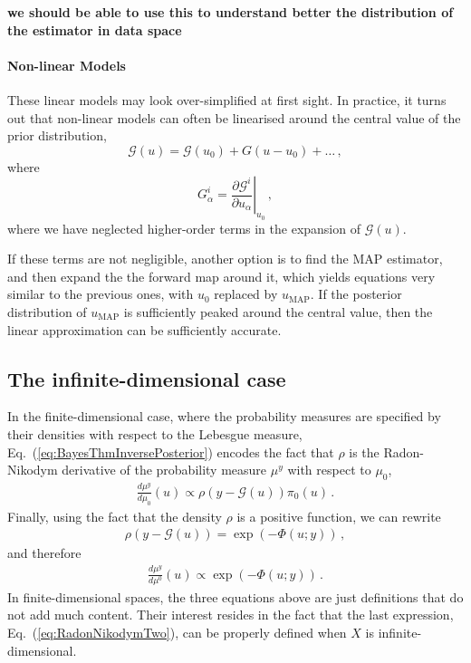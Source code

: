 {\bf we should be able to use this to understand better the distribution of the estimator in data space} 

\paragraph{Non-linear Models}

These linear models may look over-simplified at first sight. In practice, it
turns out that non-linear models can often be linearised around the central
value of the prior distribution, 
\begin{equation}
  \label{eq:LinU0}
  \mathcal{G}(u) = \mathcal{G}(u_0) + G \left(u - u_0\right) + \ldots\, ,
\end{equation}
where 
\begin{equation}
  \label{eq:FirstDerU0}
  G^i_\alpha = \left. \frac{\partial \mathcal{G}^i}{\partial u_\alpha} \right|_{u_0}\, ,
\end{equation}
where we have neglected higher-order terms in the expansion of $\mathcal{G}(u)$.

If these terms are not negligible, another option is to find the MAP estimator,
and then expand the the forward map around it, which yields equations very
similar to the previous ones, with $u_0$ replaced by $u_\mathrm{MAP}$. If the
posterior distribution of $u_\mathrm{MAP}$ is sufficiently peaked around the
central value, then the linear approximation can be sufficiently accurate. 


\subsection{The infinite-dimensional case}
\label{sec:infin-dimens-case}

In the finite-dimensional case, where the probability measures are
specified by their densities with respect to the Lebesgue measure,
Eq.~(\ref{eq:BayesThmInversePosterior}) encodes the fact that $\rho$
is the Radon-Nikodym derivative of the probability measure $\mu^y$
with respect to $\mu_0$, \viz
\begin{align}
  \label{eq:RadonNikodym}
  \frac{d\mu^y}{d\mu_0} (u) \propto \rho(y-\mathcal G(u)) \pi_0(u)\, .
\end{align}
Finally, using the fact that the density $\rho$ is a positive
function, we can rewrite 
\begin{align}
  \label{eq:PotentialDef}
  \rho(y-\mathcal G(u)) = \exp\left(-\Phi(u;y)\right)\, ,
\end{align}
and therefore
\begin{align}
  \label{eq:RadonNikodymTwo}
  \frac{d\mu^y}{d\mu^0} (u) \propto \exp\left(-\Phi(u;y)\right)\, .
\end{align}
In finite-dimensional spaces, the three equations above are just
definitions that do not add much content. Their interest resides in
the fact that the last expression, Eq.~(\ref{eq:RadonNikodymTwo}), can
be properly defined when $X$ is infinite-dimensional.

